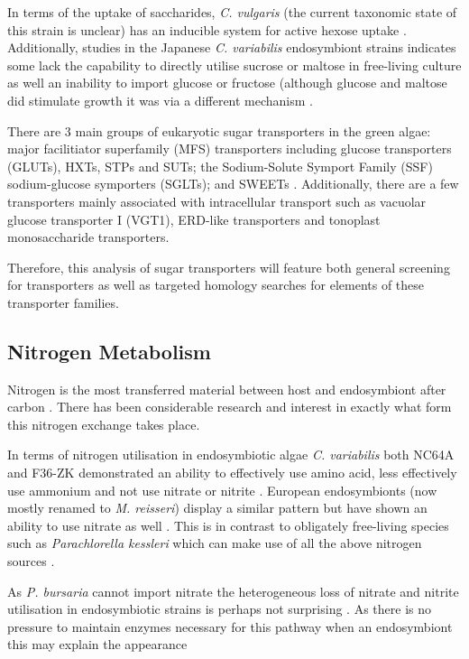 In terms of the uptake of saccharides, \textit{C. vulgaris} (the current
taxonomic state of this strain is unclear) has an inducible system for active hexose uptake \citep{Tanner1974}.
Additionally, studies in the Japanese \textit{C. variabilis} endosymbiont strains
indicates some lack the capability to directly utilise sucrose or maltose in free-living culture \citep{Kamako2005}
as well an inability to import glucose or fructose \citep{Kato2008a} (although glucose and maltose
did stimulate growth \citep{Kamako2005} it was via a different mechanism \citep{Kato2009}.

There are 3 main groups of eukaryotic sugar transporters in the green algae: 
major facilitiator superfamily (MFS) transporters including glucose
transporters (GLUTs), HXTs, STPs and SUTs; the Sodium-Solute Symport Family (SSF) sodium-glucose symporters (SGLTs); 
and SWEETs \citep{Chen2010a,Chen2015}.
Additionally, there are a few transporters mainly associated with intracellular transport such as 
vacuolar glucose transporter I (VGT1), ERD-like transporters and tonoplast monosaccharide transporters.

Therefore, this analysis of sugar transporters will feature both general screening
for transporters as well as targeted homology searches for elements of these
transporter families.

\subsection{Nitrogen Metabolism}

Nitrogen is the most transferred material between host and endosymbiont
after carbon \citep{Kato2009}.  There has been considerable research and interest
in exactly what form this nitrogen exchange takes place.


In terms of nitrogen utilisation in endosymbiotic algae 
\textit{C. variabilis} both NC64A and F36-ZK demonstrated an ability
to effectively use amino acid, less effectively use ammonium and not
use nitrate or nitrite \citep{Kamako2005,Kato2009}.
European endosymbionts (now mostly renamed to \textit{M. reisseri}) display
a similar pattern but have 
shown an ability to use nitrate as well \citep{Kessler1990}.
This is in contrast to obligately free-living species such as \textit{Parachlorella
kessleri} which can make use of all the above nitrogen sources \citep{Kato2009}.


As \textit{P. bursaria} cannot import nitrate \citep{Albers1982} the heterogeneous
loss of nitrate and nitrite utilisation in endosymbiotic strains is perhaps not surprising \citep{Kato2009}.
As there is no pressure to maintain enzymes necessary for this pathway when an endosymbiont
this may explain the appearance 

